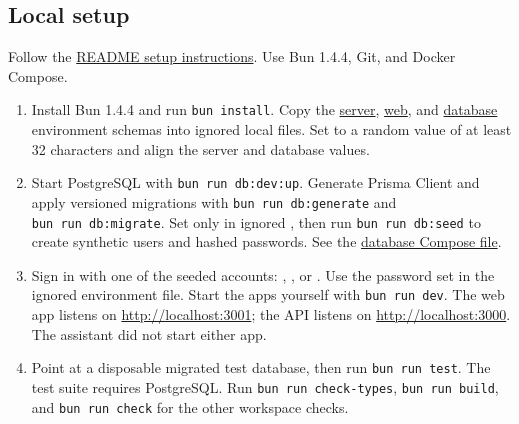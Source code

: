 \documentclass[10pt,a4paper]{article}
\newcommand{\MainFileLink}[2]{\href{https://github.com/ovenmakemeheat/Pockit/blob/main/#1}{#2}}
\begin{document}
\subsection{Local setup}
Follow the \MainFileLink{README.md}{README setup instructions}. Use Bun 1.4.4, Git, and Docker Compose.
\begin{enumerate}
  \item Install Bun 1.4.4 and run \texttt{bun\ install}. Copy the \MainFileLink{apps/server/.env.schema}{server}, \MainFileLink{apps/web/.env.schema}{web}, and \MainFileLink{packages/db/.env.schema}{database} environment schemas into ignored local files. Set  to a random value of at least 32 characters and align the server and database  values.
  \item Start PostgreSQL with \texttt{bun\ run\ db:dev:up}. Generate Prisma Client and apply versioned migrations with \texttt{bun\ run\ db:generate} and \texttt{bun\ run\ db:migrate}. Set  only in ignored , then run \texttt{bun\ run\ db:seed} to create synthetic users and hashed passwords. See the \MainFileLink{docker-compose.db.yml}{database Compose file}.
  \item Sign in with one of the seeded accounts: , , or . Use the password set in the ignored environment file. Start the apps yourself with \texttt{bun\ run\ dev}. The web app listens on \url{http://localhost:3001}; the API listens on \url{http://localhost:3000}. The assistant did not start either app.
  \item Point  at a disposable migrated test database, then run \texttt{bun\ run\ test}. The test suite requires PostgreSQL. Run \texttt{bun\ run\ check-types}, \texttt{bun\ run\ build}, and \texttt{bun\ run\ check} for the other workspace checks.
\end{enumerate}
\end{document}
